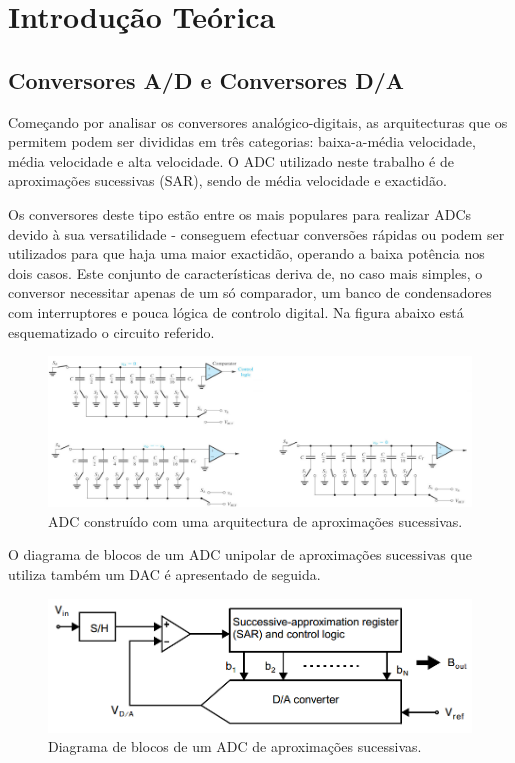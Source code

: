 \documentclass[11pt]{article}
\numberwithin{equation}{section}
\begin{document}
\section{Introdução Teórica}
\subsection{Conversores A/D e Conversores D/A}

Começando por analisar os conversores analógico-digitais, as arquitecturas que os permitem podem ser divididas em três categorias: baixa-a-média velocidade, média velocidade e alta velocidade. O ADC utilizado neste trabalho é de aproximações sucessivas (SAR), sendo de média velocidade e exactidão. 

Os conversores deste tipo estão entre os mais populares para realizar ADCs devido à sua versatilidade - conseguem efectuar conversões rápidas ou podem ser utilizados para que haja uma maior exactidão, operando a baixa potência nos dois casos. Este conjunto de características deriva de, no caso mais simples, o conversor necessitar apenas de um só comparador, um banco de condensadores com interruptores e pouca lógica de controlo digital. Na figura abaixo está esquematizado o circuito referido.

\begin{figure}[h]
	\centering
	\includegraphics[keepaspectratio=true, scale=0.47]{./teoricas/SAR_1}
	\caption{ADC construído com uma arquitectura de aproximações sucessivas.}
	\vspace{-0.8em}
\end{figure}

O diagrama de blocos de um ADC unipolar de aproximações sucessivas que utiliza também um DAC é apresentado de seguida.
	
\begin{figure}[h]
	\centering
	\includegraphics[keepaspectratio=true, scale=0.32]{./teoricas/SAR_2}
	\caption{Diagrama de blocos de um ADC de aproximações sucessivas.}
	\vspace{-0.8em}
\end{figure}
\end{document}
